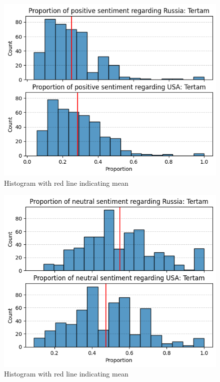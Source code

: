 \documentclass{IEEEtran}
\begin{document}
\begin{figure}
    \centering
    \includegraphics[width=1\linewidth]{figures/sig7.png}
    \caption{Histogram with red line indicating mean}
    \label{fig:positive_russia_tertam}
\end{figure}


\begin{figure}
    \centering
    \includegraphics[width=1\linewidth]{figures/sig8.png}
    \caption{Histogram with red line indicating mean}
    \label{fig:neutral_russia_tertam}
\end{figure}
\end{document}
